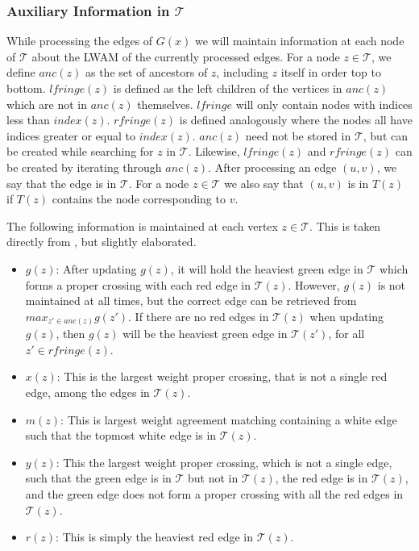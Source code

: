 \subsubsection{Auxiliary Information in $\mathcal{T}$}
While processing the edges of $G(x)$ we will maintain information at each node of $\mathcal{T}$ about the LWAM of the currently processed edges. For a node $z \in \mathcal{T}$, we define $anc(z)$ as the set of ancestors of $z$, including $z$ itself in order top to bottom. $lfringe(z)$ is defined as the left children of the vertices in $anc(z)$ which are not in $anc(z)$ themselves. $lfringe$ will only contain nodes with indices less than $index(z)$. $rfringe(z)$ is defined analogously where the nodes all have indices greater or equal to $index(z)$. $anc(z)$ need not be stored in $\mathcal{T}$, but can be created while searching for $z$ in $\mathcal{T}$. Likewise, $lfringe(z)$ and $rfringe(z)$ can be created by iterating through $anc(z)$. After processing an edge $(u,v)$, we say that the edge is in $\mathcal{T}$. For a node $z \in \mathcal{T}$ we also say that $(u,v)$ is in $T(z)$ if $T(z)$ contains the node corresponding to $v$.

The following information is maintained at each vertex $z \in \mathcal{T}$. This is taken directly from \cite{nlogn}, but slightly elaborated.
\begin{itemize}
	\item $g(z)$: After updating $g(z)$, it will hold the heaviest green edge in $\mathcal{T}$ which	forms a proper crossing with each red edge in $\mathcal{T}(z)$.
	\subitem However, $g(z)$ is not maintained at all times, but the correct edge can be retrieved from $max_{z' \in anc(z)}g(z')$.
	\subitem If there are no red edges in $\mathcal{T}(z)$ when updating $g(z)$, then $g(z)$ will be the heaviest green edge in $\mathcal{T}(z')$, for all $z' \in rfringe(z)$.
	\item $x(z)$: This is the largest weight proper crossing, that is not a single red edge, among the edges in $\mathcal{T}(z)$.
	\item $m(z)$: This is largest weight agreement matching containing a white edge
	such that the topmost white edge is in $\mathcal{T}(z)$.
	\item $y(z)$: This the largest weight proper crossing, which is not a single edge, such that the green edge is in $\mathcal{T}$ but not in $\mathcal{T}(z)$, the red edge is in $\mathcal{T}(z)$, and the green edge does not form a proper crossing with all the red edges in $\mathcal{T}(z)$.
	\item $r(z)$: This is simply the heaviest red edge in $\mathcal{T}(z)$.
\end{itemize}


